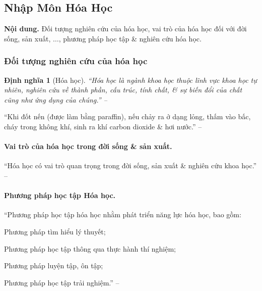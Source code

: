 \documentclass{article}
\numberwithin{equation}{section}
\newtheorem{dinhnghia}{Định nghĩa}[section]
\begin{document}

\subsection{Nhập Môn Hóa Học}
\textsf{\textbf{Nội dung.} Đối tượng nghiên cứu của hóa học, vai trò của hóa học đối với đời sống, sản xuất, $\ldots$, phương pháp học tập \& nghiên cứu hóa học.}

\subsubsection{Đối tượng nghiên cứu của hóa học}

\begin{dinhnghia}[Hóa học]
	``\emph{Hóa học} là ngành khoa học thuộc lĩnh vực khoa học tự nhiên, nghiên cứu về thành phần, cấu trúc, tính chất, \& sự biến đổi của chất cũng như ứng dụng của chúng.'' -- \cite[p. 7]{SGK_Hoa_Hoc_10_Chan_Troi_Sang_Tao}
\end{dinhnghia}
``Khi đốt nến (được làm bằng paraffin), nếu chảy ra ở dạng lỏng, thấm vào bấc, cháy trong không khí, sinh ra khí carbon dioxide \& hơi nước.'' -- \cite[p. 7]{SGK_Hoa_Hoc_10_Chan_Troi_Sang_Tao}

\paragraph{Vai trò của hóa học trong đời sống \& sản xuất.} ``Hóa học có vai trò quan trọng trong đời sống, sản xuất \& nghiên cứu khoa học.'' -- \cite[p. 8]{SGK_Hoa_Hoc_10_Chan_Troi_Sang_Tao}

\paragraph{Phương pháp học tập Hóa học.} ``Phương pháp học tập hóa học nhằm phát triển năng lực hóa học, bao gồm:
\begin{enumerate*}
	\item[\textbf{1.}] Phương pháp tìm hiểu lý thuyết;
	\item[\textbf{2.}] Phương pháp học tập thông qua thực hành thí nghiệm;
	\item[\textbf{3.}] Phương pháp luyện tập, ôn tập;
	\item[\textbf{4.}] Phương pháp học tập trải nghiệm.'' -- \cite[p. 9]{SGK_Hoa_Hoc_10_Chan_Troi_Sang_Tao}
\end{enumerate*}
\end{document}
